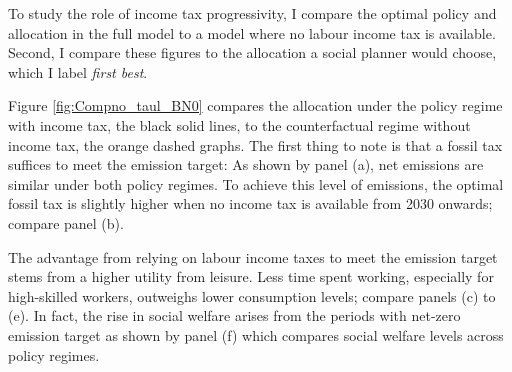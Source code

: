 \begin{figure}[h!!]
\end{figure} 

To study the role of income tax progressivity, I compare the optimal policy and allocation in the full model to a  model where no labour income tax is available. Second, I compare these figures to the allocation a social planner would choose, which I label \textit{first best}.

Figure  \ref{fig:Compno_taul_BN0} compares the allocation under the policy regime with income tax, the black solid lines, to the counterfactual regime without income tax, the orange dashed graphs. 
The first thing to note is that a fossil tax suffices to meet the emission target: As shown by panel (a), net emissions are similar under both policy regimes. To achieve this level of emissions, the optimal fossil tax is slightly higher when no income tax is available from 2030 onwards; compare panel (b).

The advantage from relying on labour income taxes to meet the emission target stems from a higher utility from leisure. Less time spent working, especially for high-skilled workers,  outweighs lower consumption levels; compare panels (c) to (e). In fact, the rise in social welfare arises from the periods with net-zero emission target as shown by panel (f) which compares social welfare levels across policy regimes. 

